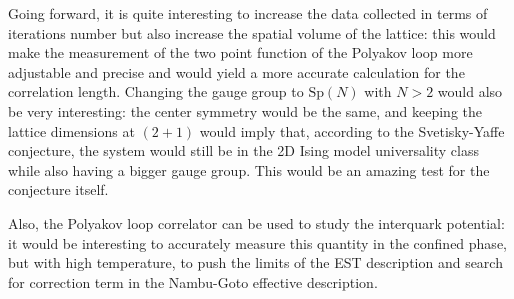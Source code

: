 \documentclass[reqno,12pt]{article}
\numberwithin{equation}{section}
\newcommand{\Sp}{\mathrm{Sp}}
\begin{document}
Going forward, it is quite interesting to increase the data collected in terms of iterations number but also increase 
the spatial volume of the lattice: this would make the measurement of the two point function of the Polyakov loop more
adjustable and precise and would yield a more accurate calculation for the correlation length. Changing the 
gauge group to $\Sp(N)$ with $N > 2$ would also be very interesting: the center symmetry would be the same, and keeping the
lattice dimensions at $(2+1)$ would imply that, according to the Svetisky-Yaffe conjecture, the system would still
be in the 2D Ising model universality class while also having a bigger gauge group. This would be an amazing test for the
conjecture itself. 

Also, the Polyakov loop correlator can be used to study the interquark potential: it would be interesting to accurately measure
this quantity in the confined phase, but with high temperature, to push the limits of the EST description and search for
correction term in the Nambu-Goto effective description.

\newpage
\end{document}
